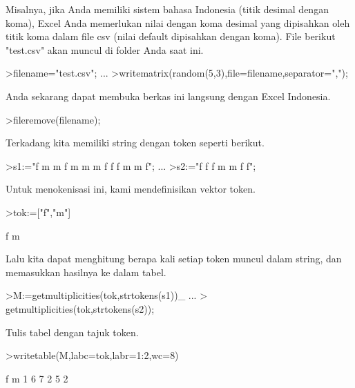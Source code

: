 \documentclass[a4paper,10pt]{article}
\begin{document}
\begin{eulernotebook}
\begin{eulercomment}
Misalnya, jika Anda memiliki sistem bahasa Indonesia (titik desimal
dengan koma), Excel Anda memerlukan nilai dengan koma desimal yang
dipisahkan oleh titik koma dalam file csv (nilai default dipisahkan
dengan koma). File berikut "test.csv" akan muncul di folder Anda saat
ini.
\end{eulercomment}
\begin{eulerprompt}
>filename="test.csv"; ...
>writematrix(random(5,3),file=filename,separator=",");
\end{eulerprompt}
\begin{eulercomment}
Anda sekarang dapat membuka berkas ini langsung dengan Excel
Indonesia.
\end{eulercomment}
\begin{eulerprompt}
>fileremove(filename);
\end{eulerprompt}
\begin{eulercomment}
Terkadang kita memiliki string dengan token seperti berikut.
\end{eulercomment}
\begin{eulerprompt}
>s1:="f m m f m m m f f f m m f";  ...
>s2:="f f f m m f f";
\end{eulerprompt}
\begin{eulercomment}
Untuk menokenisasi ini, kami mendefinisikan vektor token.
\end{eulercomment}
\begin{eulerprompt}
>tok:=["f","m"]
\end{eulerprompt}
\begin{euleroutput}
  f
  m
\end{euleroutput}
\begin{eulercomment}
Lalu kita dapat menghitung berapa kali setiap token muncul dalam
string, dan memasukkan hasilnya ke dalam tabel.
\end{eulercomment}
\begin{eulerprompt}
>M:=getmultiplicities(tok,strtokens(s1))_ ...
>  getmultiplicities(tok,strtokens(s2));
\end{eulerprompt}
\begin{eulercomment}
Tulis tabel dengan tajuk token.
\end{eulercomment}
\begin{eulerprompt}
>writetable(M,labc=tok,labr=1:2,wc=8)
\end{eulerprompt}
\begin{euleroutput}
                 f       m
         1       6       7
         2       5       2
\end{euleroutput}

\end{eulernotebook}
\end{document}
